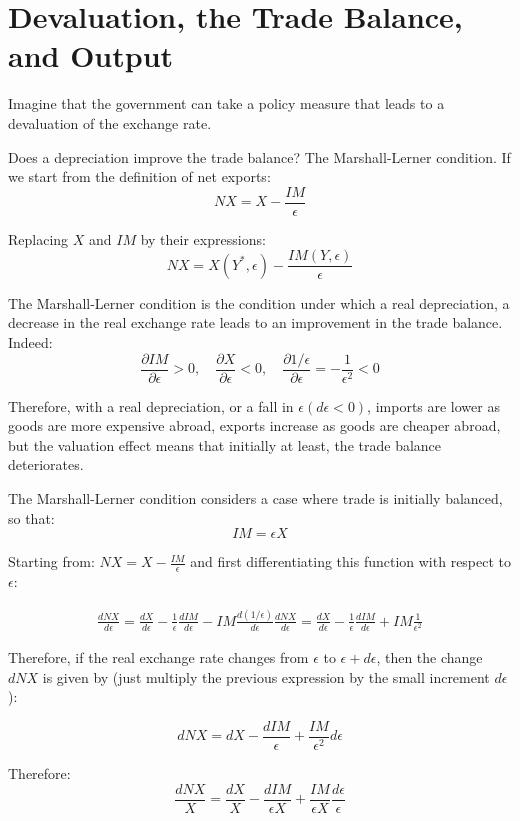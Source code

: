 \documentclass[]{book}
\theoremstyle{definition}
\theoremstyle{definition}
\theoremstyle{definition}
\theoremstyle{remark}
\begin{document}
\section{Devaluation, the Trade Balance, and
Output}\label{devaluation-the-trade-balance-and-output}

Imagine that the government can take a policy measure that leads to a
devaluation of the exchange rate.

Does a depreciation improve the trade balance? The Marshall-Lerner
condition. If we start from the definition of net exports:
\[NX=X-\frac{IM}{\epsilon}\]

Replacing \(X\) and \(IM\) by their expressions:
\[NX=X\left(Y^{*},\epsilon\right)-\frac{IM(Y,\epsilon)}{\epsilon}\]

The Marshall-Lerner condition is the condition under which a real
depreciation, a decrease in the real exchange rate leads to an
improvement in the trade balance. Indeed:
\[\frac{\partial IM}{\partial\epsilon}>0,\quad\frac{\partial X}{\partial\epsilon}<0,\quad\frac{\partial1/\epsilon}{\partial\epsilon}=-\frac{1}{\epsilon^{2}}<0\]

Therefore, with a real depreciation, or a fall in
\(\epsilon(d\epsilon<0)\), imports are lower as goods are more expensive
abroad, exports increase as goods are cheaper abroad, but the valuation
effect means that initially at least, the trade balance deteriorates.

The Marshall-Lerner condition considers a case where trade is initially
balanced, so that: \[IM=\epsilon X\]

Starting from: \(NX=X-\frac{IM}{\epsilon}\) and first differentiating
this function with respect to \(\epsilon\):

\[
\begin{aligned}
\frac{dNX}{d\epsilon}   =\frac{dX}{d\epsilon}-\frac{1}{\epsilon}\frac{dIM}{d\epsilon}-IM\frac{d(1/\epsilon)}{d\epsilon}
\frac{dNX}{d\epsilon}   =\frac{dX}{d\epsilon}-\frac{1}{\epsilon}\frac{dIM}{d\epsilon}+IM\frac{1}{\epsilon^{2}}
\end{aligned}
\]

Therefore, if the real exchange rate changes from \(\epsilon\) to
\(\epsilon+d\epsilon\), then the change \(dNX\) is given by (just
multiply the previous expression by the small increment \(d\epsilon\)):

\[dNX=dX-\frac{dIM}{\epsilon}+\frac{IM}{\epsilon^{2}}d\epsilon\]

Therefore:
\[\frac{dNX}{X}=\frac{dX}{X}-\frac{dIM}{\epsilon X}+\frac{IM}{\epsilon X}\frac{d\epsilon}{\epsilon}\]
\end{document}
